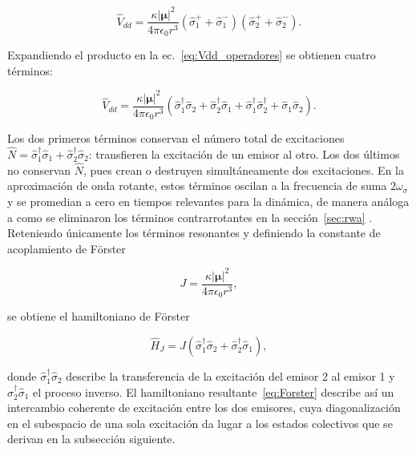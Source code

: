 \begin{equation}
	\hat{V}_{dd} = \frac{\kappa|\boldsymbol{\mu}|^2}{4\pi\epsilon_0 r^3}
	\left(\hat{\sigma}_1^+ + \hat{\sigma}_1^-\right)
	\left(\hat{\sigma}_2^+ + \hat{\sigma}_2^-\right).
	\label{eq:Vdd_operadores}
\end{equation}

Expandiendo el producto en la ec.~\eqref{eq:Vdd_operadores} se obtienen cuatro términos:

\begin{equation}
	\hat{V}_{dd} = \frac{\kappa|\boldsymbol{\mu}|^2}{4\pi\epsilon_0 r^3}
	\left(
	\hat{\sigma}_1^\dagger\hat{\sigma}_2 +
	\hat{\sigma}_2^\dagger\hat{\sigma}_1 +
	\hat{\sigma}_1^\dagger\hat{\sigma}_2^\dagger +
	\hat{\sigma}_1\hat{\sigma}_2
	\right).
	\label{eq:Vdd_4terms}
\end{equation}

Los dos primeros términos conservan el número total de excitaciones $\hat{N} = \hat{\sigma}_1^\dagger\hat{\sigma}_1 + \hat{\sigma}_2^\dagger\hat{\sigma}_2$: transfieren la excitación de un emisor al otro. Los dos últimos no conservan $\hat{N}$, pues crean o destruyen simultáneamente dos excitaciones. En la aproximación de onda rotante, estos términos oscilan a la frecuencia de suma $2\omega_\sigma$ y se promedian a cero en tiempos relevantes para la dinámica, de manera análoga a como se eliminaron los términos contrarrotantes en la sección~\ref{sec:rwa} \cite{gerry2005}. Reteniendo únicamente los términos resonantes y definiendo la constante de acoplamiento de Förster

\begin{equation}
	J = \frac{\kappa|\boldsymbol{\mu}|^2}{4\pi\epsilon_0 r^3},
	\label{eq:J_Forster}
\end{equation}

se obtiene el hamiltoniano de Förster

\begin{equation}
	\hat{H}_J = J\!\left(\hat{\sigma}_1^\dagger\hat{\sigma}_2 +
	\hat{\sigma}_2^\dagger\hat{\sigma}_1\right),
	\label{eq:Forster}
\end{equation}

donde $\hat{\sigma}_1^\dagger\hat{\sigma}_2$ describe la transferencia de la excitación del emisor 2 al emisor 1 y $\hat{\sigma}_2^\dagger\hat{\sigma}_1$ el proceso inverso. El hamiltoniano resultante~\eqref{eq:Forster} describe así un intercambio coherente de excitación entre los dos emisores, cuya diagonalización en el subespacio de una sola excitación da lugar a los estados colectivos que se derivan en la subsección siguiente.

